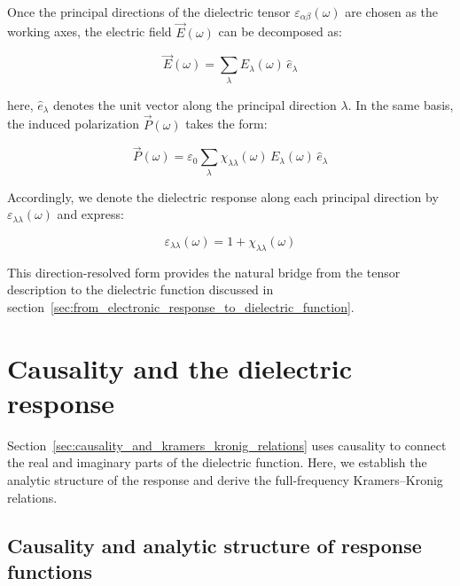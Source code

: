 Once the principal directions of the dielectric tensor $\varepsilon_{\alpha\beta}(\omega)$ are chosen as the working axes, the electric field $\vec{E}(\omega)$ can be decomposed as:

\begin{equation}
    \vec{E}(\omega)=\sum_{\lambda}E_{\lambda}(\omega)\,\hat{e}_{\lambda}
\label{electric_field_decomposition_principal_directions}
\end{equation}

here, $\hat{e}_{\lambda}$ denotes the unit vector along the principal direction $\lambda$.
In the same basis, the induced polarization $\vec{P}(\omega)$ takes the form:

\begin{equation}
    \vec{P}(\omega)=\varepsilon_0\sum_{\lambda}\chi_{\lambda\lambda}(\omega)\,E_{\lambda}(\omega)\,\hat{e}_{\lambda}
\label{polarization_decomposition_principal_directions}
\end{equation}

Accordingly, we denote the dielectric response along each principal direction by $\varepsilon_{\lambda\lambda}(\omega)$ and express:

\begin{equation}
    \varepsilon_{\lambda\lambda}(\omega)=1+\chi_{\lambda\lambda}(\omega)
\label{direction_resolved_dielectric_response}
\end{equation}

This direction-resolved form provides the natural bridge from the tensor description to the dielectric function discussed in section~\ref{sec:from_electronic_response_to_dielectric_function}.

\newpage
\FloatBarrier
\section{Causality and the dielectric response}
\label{sec:causality_derivation_basic}

Section~\ref{sec:causality_and_kramers_kronig_relations} uses causality to connect the real and imaginary parts of the dielectric function.
Here, we establish the analytic structure of the response and derive the full-frequency Kramers--Kronig relations.

\FloatBarrier
\subsection{Causality and analytic structure of response functions}

